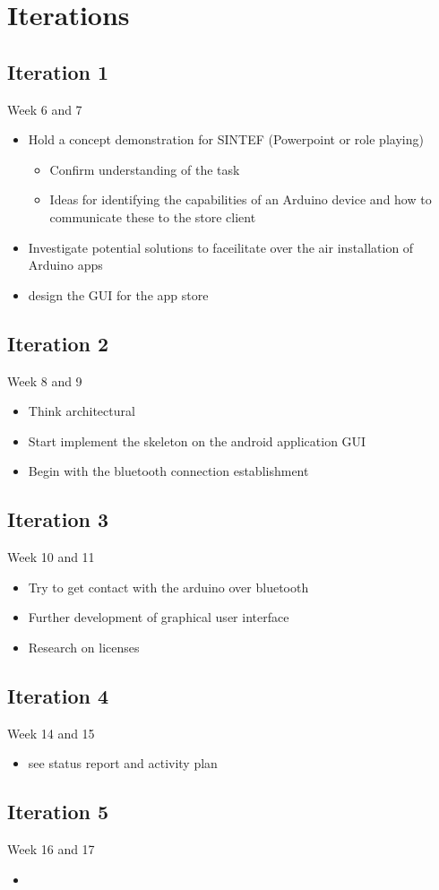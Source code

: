 \chapter{Iterations}
\section{Iteration 1}
Week 6 and 7
\begin{itemize}
	\item{Hold a concept demonstration for SINTEF (Powerpoint or role playing)}
	\begin{itemize}
		\item{Confirm understanding of the task}
		\item{Ideas for identifying the capabilities of an Arduino device and how to communicate these to the store client}
	\end{itemize}
	\item{Investigate potential solutions to faceilitate over the air installation of Arduino apps}
	\item{design the GUI for the app store}
\end{itemize}

\section{Iteration 2}
Week 8 and 9
\begin{itemize}
	\item{Think architectural}
	\item{Start implement the skeleton on the android application GUI}
	\item{Begin with the bluetooth connection establishment}
\end{itemize}

\section{Iteration 3}
Week 10 and 11
\begin{itemize}
	\item{Try to get contact with the arduino over bluetooth}
	\item{Further development of graphical user interface}
	\item{Research on licenses}
\end{itemize}

\section{Iteration 4}
Week 14 and 15
\begin{itemize}
	\item{see status report and activity plan}
\end{itemize}

\section{Iteration 5}
Week 16 and 17
\begin{itemize}
	\item{}
\end{itemize}